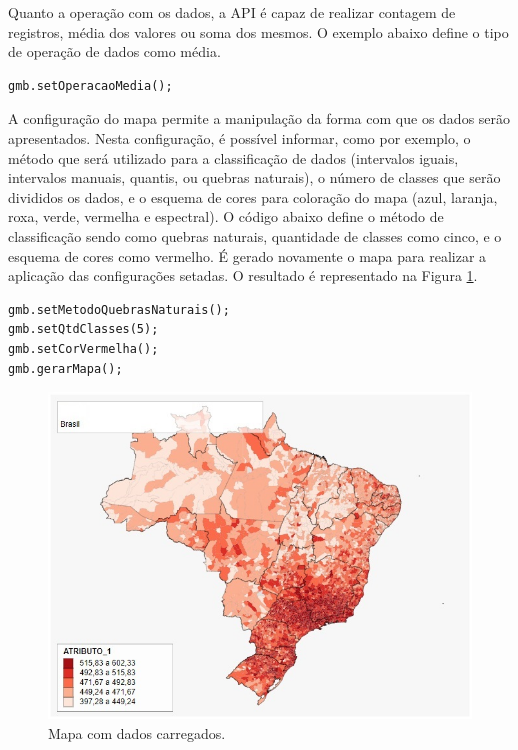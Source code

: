 \documentclass[12pt]{article}
\begin{document}
Quanto a operação com os dados, a API é capaz de realizar contagem de registros, média dos valores ou soma dos mesmos. O exemplo abaixo define o tipo de operação de dados como média.

\begin{lstlisting}
gmb.setOperacaoMedia();
\end{lstlisting}

A configuração do mapa permite a manipulação da forma com que os dados serão apresentados. Nesta configuração, é possível informar, como por exemplo, o método que será utilizado para a classificação de dados (intervalos iguais, intervalos manuais, quantis, ou quebras naturais), o número de classes que serão divididos os dados, e o esquema de cores para coloração do mapa (azul, laranja, roxa, verde, vermelha e espectral). O código abaixo define o método de classificação sendo como quebras naturais, quantidade de classes como cinco, e o esquema de cores como vermelho. É gerado novamente o mapa para realizar a aplicação das configurações setadas. O resultado é representado na Figura \ref{mapaCarregado}.

\begin{lstlisting}
gmb.setMetodoQuebrasNaturais();
gmb.setQtdClasses(5);
gmb.setCorVermelha();
gmb.gerarMapa();
\end{lstlisting}

\begin{figure}[!h]
\centering
\includegraphics[scale=0.65]{mapa-carregado.jpg}
\caption{Mapa com dados carregados.}
\label{mapaCarregado}
\end{figure}
\end{document}
